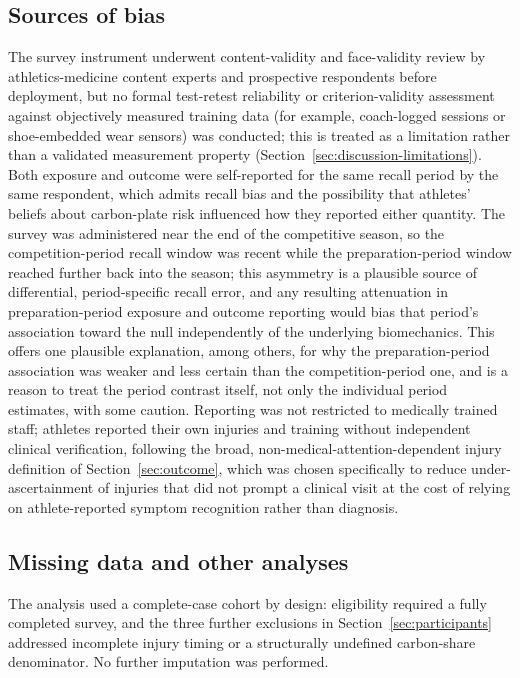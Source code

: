 \subsection{Sources of bias}
\label{sec:bias}
The survey instrument underwent content-validity and face-validity review by athletics-medicine content experts and prospective respondents before deployment, but no formal test-retest reliability or criterion-validity assessment against objectively measured training data (for example, coach-logged sessions or shoe-embedded wear sensors) was conducted; this is treated as a limitation rather than a validated measurement property (Section~\ref{sec:discussion-limitations}). Both exposure and outcome were self-reported for the same recall period by the same respondent, which admits recall bias and the possibility that athletes' beliefs about carbon-plate risk influenced how they reported either quantity. The survey was administered near the end of the competitive season, so the competition-period recall window was recent while the preparation-period window reached further back into the season; this asymmetry is a plausible source of differential, period-specific recall error, and any resulting attenuation in preparation-period exposure and outcome reporting would bias that period's association toward the null independently of the underlying biomechanics. This offers one plausible explanation, among others, for why the preparation-period association was weaker and less certain than the competition-period one, and is a reason to treat the period contrast itself, not only the individual period estimates, with some caution. Reporting was not restricted to medically trained staff; athletes reported their own injuries and training without independent clinical verification, following the broad, non-medical-attention-dependent injury definition of Section~\ref{sec:outcome}, which was chosen specifically to reduce under-ascertainment of injuries that did not prompt a clinical visit at the cost of relying on athlete-reported symptom recognition rather than diagnosis.

\subsection{Missing data and other analyses}
\label{sec:missing}
The analysis used a complete-case cohort by design: eligibility required a fully completed survey, and the three further exclusions in Section~\ref{sec:participants} addressed incomplete injury timing or a structurally undefined carbon-share denominator. No further imputation was performed.

